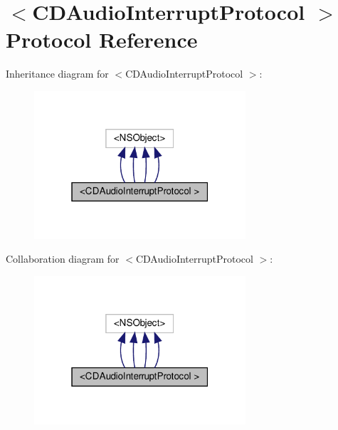 \hypertarget{protocolCDAudioInterruptProtocol_01-p}{}\section{$<$C\+D\+Audio\+Interrupt\+Protocol $>$ Protocol Reference}
\label{protocolCDAudioInterruptProtocol_01-p}


Inheritance diagram for $<$C\+D\+Audio\+Interrupt\+Protocol $>$\+:
\nopagebreak
\begin{figure}[H]
\begin{center}
\leavevmode
\includegraphics[width=223pt]{protocolCDAudioInterruptProtocol_01-p__inherit__graph}
\end{center}
\end{figure}


Collaboration diagram for $<$C\+D\+Audio\+Interrupt\+Protocol $>$\+:
\nopagebreak
\begin{figure}[H]
\begin{center}
\leavevmode
\includegraphics[width=223pt]{protocolCDAudioInterruptProtocol_01-p__coll__graph}
\end{center}
\end{figure}
